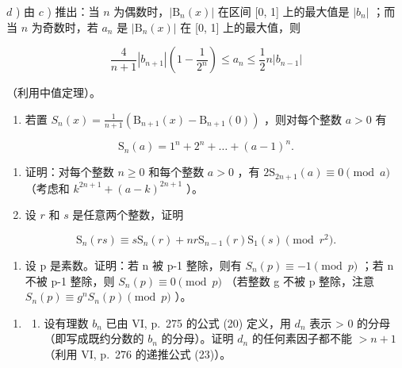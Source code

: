 \(d\) ) 由 \(c\) ) 推出：当 \(n\) 为偶数时，\(|\mathrm{B}_n(x)|\) 在区间 {[}0, 1{]} 上的最大值是 \(|b_n|\) ；而当 \(n\) 为奇数时，若 \(a_{n}\) 是 \(|\mathrm{B}_n(x)|\) 在 {[}0, 1{]} 上的最大值，则

\[
\frac {4}{n + 1} \left| b _ {n + 1} \right| \left(1 - \frac {1}{2 ^ {n}}\right) \leqslant a _ {n} \leqslant \frac {1}{2} n \left| b _ {n - 1} \right|
\]

（利用中值定理）。

\begin{enumerate}
\def\labelenumi{\arabic{enumi})}
\setcounter{enumi}{4}
\tightlist
\item
  若置 \(S_{n}(x) = \frac{1}{n + 1} (\mathrm{B}_{n + 1}(x) - \mathrm{B}_{n + 1}(0))\) ，则对每个整数 \(a > 0\) 有
\end{enumerate}

\[
\mathrm{S} _ {n} (a) = 1 ^ {n} + 2 ^ {n} + \dots + (a - 1) ^ {n}.
\]

\begin{enumerate}
\def\labelenumi{\alph{enumi})}
\item
  证明：对每个整数 \(n \geqslant 0\) 和每个整数 \(a > 0\) ，有 \(2\mathrm{S}_{2n + 1}(a) \equiv 0 \pmod{a}\) （考虑和 \(k^{2n + 1} + (a - k)^{2n + 1}\) ）。
\item
  设 \(r\) 和 \(s\) 是任意两个整数，证明
\end{enumerate}

\[
\mathrm{S} _ {n} (r s) \equiv s \mathrm{S} _ {n} (r) + n r \mathrm{S} _ {n - 1} (r) \mathrm{S} _ {1} (s) \pmod {r ^ {2}}.
\]

\begin{enumerate}
\def\labelenumi{\alph{enumi})}
\setcounter{enumi}{2}
\tightlist
\item
  设 p 是素数。证明：若 n 被 p-1 整除，则有 \(S_{n}(p) \equiv -1 \pmod{p}\) ；若 n 不被 p-1 整除，则 \(S_{n}(p) \equiv 0 \pmod{p}\) （若整数 g 不被 p 整除，注意 \(S_{n}(p) \equiv g^{n}S_{n}(p) \pmod{p}\) ）。
\end{enumerate}

\begin{enumerate}
\def\labelenumi{\arabic{enumi})}
\setcounter{enumi}{5}
\tightlist
\item
  \begin{enumerate}
  \def\labelenumii{\alph{enumii})}
  \tightlist
  \item
    设有理数 \(b_{n}\) 已由 VI, p.~275 的公式 (20) 定义，用 \(d_{n}\) 表示 \textgreater{} 0 的分母（即写成既约分数的 \(b_{n}\) 的分母）。证明 \(d_{n}\) 的任何素因子都不能 \(> n + 1\) （利用 VI, p.~276 的递推公式 (23)）。
  \end{enumerate}
\end{enumerate}

